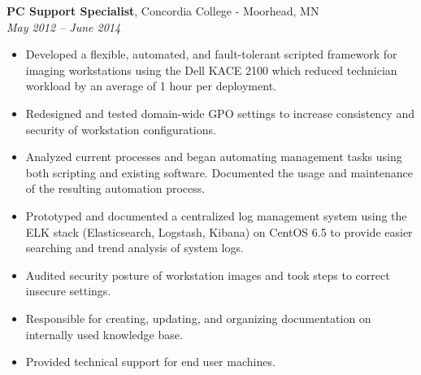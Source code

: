 {\bf PC Support Specialist}, Concordia College - Moorhead, MN\\
{\it May 2012 – June 2014}
\begin{itemize}
	\item Developed a flexible, automated, and fault-tolerant scripted framework for imaging workstations using the Dell KACE 2100 which reduced technician workload by an average of 1 hour per deployment.
	\item Redesigned and tested domain-wide GPO settings to increase consistency and security of workstation configurations.
	\item Analyzed current processes and began automating management tasks using both scripting and existing software. Documented the usage and maintenance of the resulting automation process.
	\item Prototyped and documented a centralized log management system using the ELK stack (Elasticsearch, Logstash, Kibana) on CentOS 6.5 to provide easier searching and trend analysis of system logs.
	\item Audited security posture of workstation images and took steps to correct insecure settings.
	\item Responsible for creating, updating, and organizing documentation on internally used knowledge base.
	\item Provided technical support for end user machines.
\end{itemize}